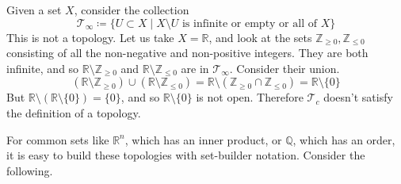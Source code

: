 \documentclass{article}
\begin{document}
    \begin{example}
      Given a set $X$, consider the collection 
      \begin{equation}
        \mathscr{T}_\infty \coloneqq \{U \subset X \mid X \setminus U \text{ is infinite or empty or all of }X \}
      \end{equation}
      This is not a topology. Let us take $X = \mathbb{R}$, and look at the sets $\mathbb{Z}_{\geq 0}, \mathbb{Z}_{\leq 0}$ consisting of all the non-negative and non-positive integers. They are both infinite, and so $\mathbb{R} \setminus \mathbb{Z}_{\geq 0}$ and $\mathbb{R} \setminus \mathbb{Z}_{\leq 0}$ are in $\mathcal{T}_\infty$. Consider their union. 
      \begin{equation}
        (\mathbb{R} \setminus \mathbb{Z}_{\geq 0}) \cup (\mathbb{R} \setminus \mathbb{Z}_{\leq 0}) = \mathbb{R} \setminus (\mathbb{Z}_{\geq 0} \cap \mathbb{Z}_{\leq 0}) = \mathbb{R} \setminus \{0\}
      \end{equation}
      But $\mathbb{R} \setminus (\mathbb{R} \setminus \{0\}) = \{0\}$, and so $\mathbb{R} \setminus \{0\}$ is not open. Therefore $\mathcal{T}_c$ doesn't satisfy the definition of a topology. 
    \end{example}

    For common sets like $\mathbb{R}^n$, which has an inner product, or $\mathbb{Q}$, which has an order, it is easy to build these topologies with set-builder notation. Consider the following. 
\end{document}

